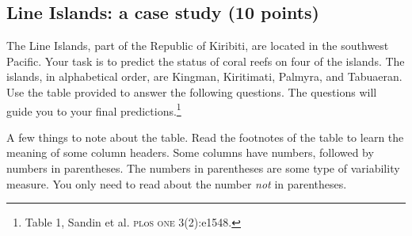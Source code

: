 \documentclass[12pt, hidelinks]{exam}
\begin{document}
\subsection*{Line Islands: a case study (10 points)}

The Line Islands, part of the Republic of Kiribiti, are located in the southwest Pacific. Your task is to predict the status of coral reefs on four of the islands. The islands, in alphabetical order, are Kingman, Kiritimati, Palmyra, and Tabuaeran.  Use the table provided to answer the following questions. The questions will guide you to your final predictions.\footnote{Table 1, Sandin et al. \textsc{pl}o\textsc{s one} 3(2):e1548.} 

A few things to note about the table. Read the footnotes of the table to learn the meaning of some column headers. Some columns have numbers, followed by numbers in parentheses. The numbers in parentheses are some type of variability measure. You only need to read about the number \emph{not} in parentheses.
\end{document}
